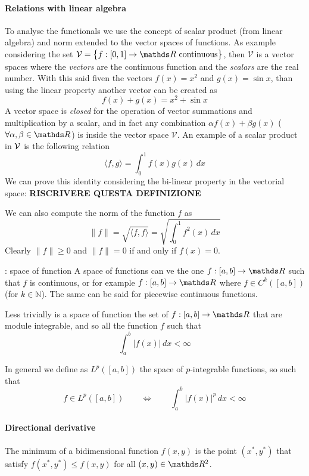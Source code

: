 	\paragraph{Relations with linear algebra} To analyse the functionals we use the concept of scalar product (from linear algebra) and norm extended to the vector spaces of functions. As example considering the set $\mathcal V = \big\{ f: [0,1]\rightarrow \R \textrm{ continuous} \big\}$, then $\mathcal V$ is a vector spaces where the \textit{vectors} are the continuous function and the \textit{scalars} are the real number. With this said fiven the vectors $f(x) = x^2$ and $g(x) = \sin x$, than using the linear property another vector can be created as
	\[ f(x) + g(x) = x^2 + \sin x \]
	A vector space is \textit{closed} for the operation of vector summations and multiplication by a scalar, and in fact any combination $\alpha f(x) + \beta g(x)$ ($\forall \alpha,\beta\in \R$) is inside the vector space $\mathcal V$. An example of a scalar product in $\mathcal{V}$ is the following relation
	\[ \langle f,g\rangle = \int_0^1 f(x)g(x)\, dx \]
	We can prove this identity considering the bi-linear property in the vectorial space:
	\textbf{RISCRIVERE QUESTA DEFINIZIONE}
	
	We can also compute the norm of the function $f$ as
	\[ \|f\| = \sqrt{\langle f,f\rangle} = \sqrt{\int_0^1 f^2(x)\, dx} \]
	Clearly $\|f\| \geq 0$ and $\|f\| = 0$ if and only if $f(x) = 0$. 
	
	\begin{example}{: space of function}
		A space of functions can ve the one $f:[a,b]\rightarrow \R$ such that $f$ is continuous, or for example $f:[a,b]\rightarrow \R$ where $f\in C^k([a,b])$ (for $k\in \mathds N$). The same can be said for piecewise continuous functions.
		
		Less trivially is a space of function the set of $f:[a,b]\rightarrow \R$ that are module integrable, and so all the function $f$ such that
		\[\int_a^b |f(x)|\, dx < \infty\]
		
	\end{example}

	In general we define as $L^p([a,b])$ the space of $p$-integrable functions, so such that
	\[ f\in L^p([a,b])  \qquad \Leftrightarrow \qquad \int_a^b |f(x)|^p\, dx < \infty\]
	
	
	\paragraph{Directional derivative} The minimum of a bidimensional function $f(x,y)$ is the point $(x^*,y^*)$ that satisfy $f(x^*,y^*)\leq f(x,y)$ for all $(x,y)\in \R^2$.
	
